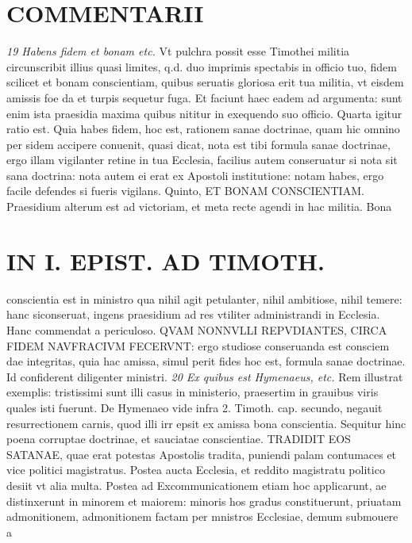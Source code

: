 \documentclass{article}
\begin{document}
\begin{pages}
\section*{COMMENTARII }
\marginpar{[ p.40 ]}
\textit{19 Habens fidem et bonam etc. }\pstart Vt pulchra possit esse Timothei militia circunscribit illius quasi limites, q.d. duo imprimis spectabis in officio tuo, fidem scilicet et bonam conscientiam, quibus seruatis gloriosa erit tua militia, vt eisdem amissis foe da et turpis sequetur fuga. Et faciunt haec eadem ad argumenta: sunt enim ista praesidia maxima quibus nititur in exequendo suo officio.  \pend\pstart Quarta igitur ratio est. Quia habes fidem, hoc est, rationem sanae doctrinae, quam hic omnino per sidem accipere conuenit, quasi dicat, nota est tibi formula sanae doctrinae, ergo illam vigilanter retine in tua Ecclesia, facilius autem conseruatur si nota sit sana doctrina: nota autem ei erat ex Apostoli institutione: notam habes, ergo facile defendes si fueris vigilans.  \pend\pstart Quinto, ET BONAM CONSCIENTIAM. Praesidium alterum est ad victoriam, et meta recte agendi in hac militia. Bona  \pend
\section*{IN I. EPIST. AD TIMOTH. }
\marginpar{[ p.41 ]}\pstart conscientia est in ministro qua nihil agit petulanter, nihil ambitiose, nihil temere: hanc siconseruat, ingens praesidium ad res vtiliter administrandi in Ecclesia. Hanc commendat a periculoso. QVAM NONNVLLI REPVDIANTES, CIRCA FIDEM NAVFRACIVM FECERVNT: ergo studiose conseruanda est consciem dae integritas, quia hac amissa, simul perit fides hoc est, formula sanae doctrinae. Id confiderent diligenter ministri.  \pend
\textit{20 Ex quibus est Hymenaeus, etc. }\pstart Rem illustrat exemplis: tristissimi sunt illi casus in ministerio, praesertim in grauibus viris quales isti fuerunt. De Hymenaeo vide infra 2. Timoth. cap. secundo, negauit resurrectionem carnis, quod illi irr epsit ex amissa bona conscientia. Sequitur hinc poena corruptae doctrinae, et sauciatae conscientiae. TRADIDIT EOS SATANAE, quae erat potestas Apostolis tradita, puniendi palam contumaces et vice politici magistratus. Postea aucta Ecclesia, et reddito magistratu politico desiit vt alia multa. Postea ad Excommunicationem etiam hoc applicarunt, ae distinxerunt in minorem et maiorem: minoris hos gradus constituerunt, priuatam admonitionem, admonitionem factam per mnistros Ecclesiae, demum submouere a  \pend

\end{pages}
\end{document}

